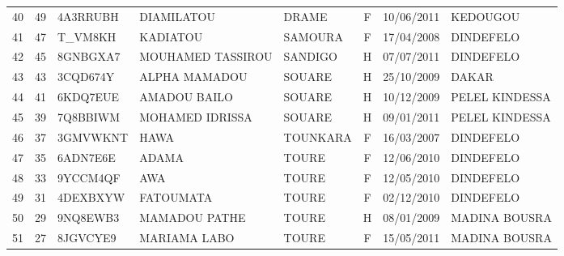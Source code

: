 \documentclass[10pt,a4paper]{article}
\begin{document}
\begin{center}
\begin{tabular}{cclllcll}
40 & 49 & 4A3RRUBH  & DIAMILATOU       & DRAME     & F & 10/06/2011 & KEDOUGOU \\
41 & 47  & T\_VM8KH   & KADIATOU         & SAMOURA   & F & 17/04/2008 & DINDEFELO \\
42 & 45 & 8GNBGXA7  & MOUHAMED TASSIROU& SANDIGO   & H & 07/07/2011 & DINDEFELO \\
43 & 43 & 3CQD674Y  & ALPHA MAMADOU    & SOUARE    & H & 25/10/2009 & DAKAR \\
44 & 41 & 6KDQ7EUE  & AMADOU BAILO     & SOUARE    & H & 10/12/2009 & PELEL KINDESSA \\
45 & 39 & 7Q8BBIWM  & MOHAMED IDRISSA  & SOUARE    & H & 09/01/2011 & PELEL KINDESSA \\
46 & 37 & 3GMVWKNT  & HAWA             & TOUNKARA  & F & 16/03/2007 & DINDEFELO \\
47 & 35 & 6ADN7E6E  & ADAMA            & TOURE     & F & 12/06/2010 & DINDEFELO \\
48 & 33 & 9YCCM4QF  & AWA              & TOURE     & F & 12/05/2010 & DINDEFELO \\
49 & 31 & 4DEXBXYW  & FATOUMATA        & TOURE     & F & 02/12/2010 & DINDEFELO \\
50 & 29 & 9NQ8EWB3  & MAMADOU PATHE    & TOURE     & H & 08/01/2009 & MADINA BOUSRA \\
51 & 27 & 8JGVCYE9  & MARIAMA LABO     & TOURE     & F & 15/05/2011 & MADINA BOUSRA \\
\bottomrule
\end{tabular}
\end{center}
\end{document}
